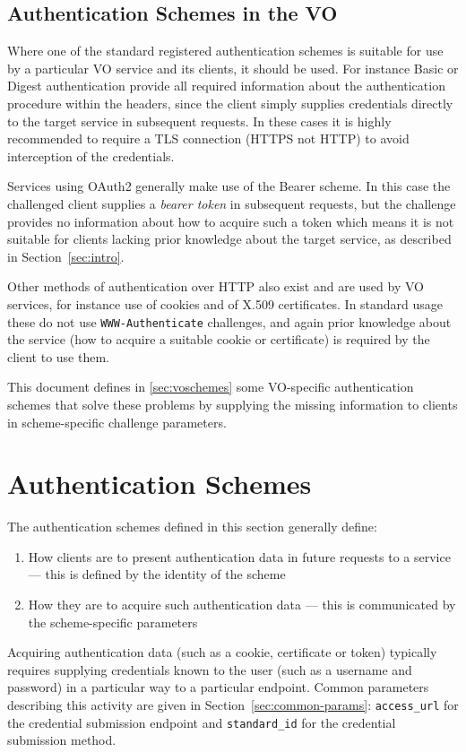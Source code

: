 \documentclass[11pt,a4paper]{ivoa}
\newcommand{\header}[1]{{\tt #1}}
\begin{document}
\subsection{Authentication Schemes in the VO}

Where one of the standard registered authentication schemes is
suitable for use by a particular VO service and its clients,
it should be used.
For instance Basic or Digest authentication provide all required
information about the authentication procedure within the headers,
since the client simply supplies credentials directly to the target
service in subsequent requests.  In these cases it is highly recommended
to require a TLS connection (HTTPS not HTTP) to avoid interception of
the credentials.

Services using OAuth2 generally make use of the Bearer scheme.
In this case the challenged client supplies a {\em bearer token}
in subsequent requests,
but the challenge provides no information about how to acquire
such a token which means it is not suitable for clients lacking
prior knowledge about the target service, as described in
Section~\ref{sec:intro}.

Other methods of authentication over HTTP also exist
and are used by VO services,
for instance use of cookies and of X.509 certificates.
In standard usage these do not use \header{WWW-Authenticate} challenges,
and again prior knowledge about the service
(how to acquire a suitable cookie or certificate)
is required by the client to use them.

This document defines in \ref{sec:voschemes}
some VO-specific authentication schemes
that solve these problems by supplying the missing information to
clients in scheme-specific challenge parameters.

\section{Authentication Schemes}\label{sec:authschemes}

The authentication schemes defined in this section
generally define:
\begin{enumerate}
  \item How clients are to present authentication data in future requests
        to a service --- this is defined by the identity of the scheme
  \item How they are to acquire such authentication data ---
        this is communicated by the scheme-specific parameters
\end{enumerate}
Acquiring authentication data (such as a cookie, certificate or token)
typically requires supplying credentials known to the user 
(such as a username and password) in a particular way to a particular
endpoint.
Common parameters describing this activity are given in
Section~\ref{sec:common-params}:
\verb|access_url| for the credential submission endpoint and
\verb|standard_id| for the credential submission method.
\end{document}

